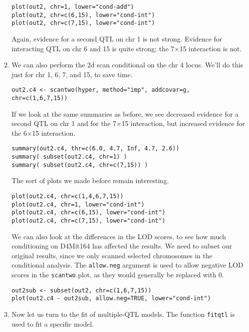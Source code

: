 \documentclass[10pt,letterpaper]{article}
\newcommand{\usercolor}{\color [named]{BlueViolet}}
\begin{document}
\begin{enumerate}
\usercolor \verb|plot(out2, chr=1, lower="cond-add")| \\
\verb|plot(out2, chr=c(6,15), lower="cond-int")| \\
\verb|plot(out2, chr=c(7,15), lower="cond-int")| \normalcolor

Again, evidence for a second QTL on chr 1 is not strong.
Evidence for interacting QTL on chr 6 and 15 is quite strong;
the 7$\times$15 interaction is not.  

\item We can also perform the 2d scan conditional on the chr 4
  locus.  We'll do this just for chr 1, 6, 7, and 15, to save
  time.

\usercolor \verb|out2.c4 <- scantwo(hyper, method="imp", addcovar=g, chr=c(1,6,7,15))| \normalcolor

  If we look at the same summaries as before, we see decreased
  evidence for a second QTL on chr 1 and for the 7$\times$15
  interaction, but increased evidence for the 6$\times$15 interaction.

\usercolor \verb|summary(out2.c4, thr=c(6.0, 4.7, Inf, 4.7, 2.6))| \\
\verb|summary( subset(out2.c4, chr=1) )| \\
\verb|summary( subset(out2.c4, chr=c(7,15)) )| 
\normalcolor

  The sort of plots we made before remain interesting.

\usercolor \verb|plot(out2.c4, chr=c(1,4,6,7,15))| \\
\verb|plot(out2.c4, chr=1, lower="cond-int")| \\
\verb|plot(out2.c4, chr=c(6,15), lower="cond-int")| \\
\verb|plot(out2.c4, chr=c(7,15), lower="cond-int")| \normalcolor

  We can also look at the differences in the LOD scores, to see how
  much conditioning on D4Mit164 has affected the results.  We need to
  subset our original results, since we only scanned selected
  chromosomes in the conditional analysis.  The \verb-allow.neg-
  argument is used to allow negative LOD scores in the \verb-scantwo-
  plot, as they would generally be replaced with 0.  

\usercolor \verb|out2sub <- subset(out2, chr=c(1,6,7,15))| \\
\verb|plot(out2.c4 - out2sub, allow.neg=TRUE, lower="cond-int")|
\normalcolor

\item Now let us turn to the fit of multiple-QTL models.  The function
  \verb-fitqtl- is used to fit a specific model. 


\end{enumerate}
\end{document}
